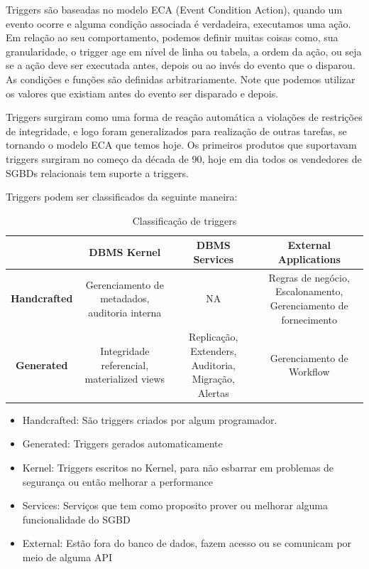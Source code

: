 \documentclass[conference]{IEEEtran}
\begin{document}
    Triggers são baseadas no modelo ECA (Event Condition Action), quando um evento ocorre e alguma condição associada é verdadeira, executamos uma ação. Em relação ao seu comportamento, podemos definir muitas coisas como, sua granularidade, o trigger age em nível de linha ou tabela, a ordem da ação, ou seja se a ação deve ser executada antes, depois ou ao invés do evento que o disparou. As condições e funções são definidas arbitrariamente. Note que podemos utilizar os valores que existiam antes do evento ser disparado e depois.

    Triggers surgiram como uma forma de reação automática a violações de restrições de integridade, e logo foram generalizados para realização de outras tarefas, se tornando o modelo ECA que temos hoje. Os primeiros produtos que suportavam triggers surgiram no começo da década de 90, hoje em dia todos os vendedores de SGBDs relacionais tem suporte a triggers.

    Triggers podem ser classificados da seguinte maneira:

 \begin{table}[!t]
    \renewcommand{\arraystretch}{1}
    \caption{Classificação de triggers}
    \label{table_example}
    \centering
    \begin{tabular}{ c  c  c  c  }
      \hline 
	 & \bfseries DBMS Kernel & \bfseries DBMS Services & \bfseries External Applications \\
        \hline
            \bfseries Handcrafted &
            Gerenciamento de metadados, auditoria interna &
            NA &
            Regras de negócio, Escalonamento, Gerenciamento de fornecimento\\
	\hline
            \bfseries Generated &
            Integridade referencial, materialized views &
            Replicação, Extenders, Auditoria, Migração, Alertas &
            Gerenciamento de Workflow \\
	\hline
        \end{tabular}
    \end{table}

    \begin{itemize}
        \item{Handcrafted}: São triggers criados por algum programador.
        \item{Generated}: Triggers gerados automaticamente
        \item{Kernel}: Triggers escritos no Kernel, para não esbarrar em problemas de segurança ou então melhorar a performance
        \item{Services}: Serviços que tem como proposito prover ou melhorar alguma funcionalidade do SGBD
        \item{External}: Estão fora do banco de dados, fazem acesso ou se comunicam por meio de alguma API
    \end{itemize}
\end{document}
